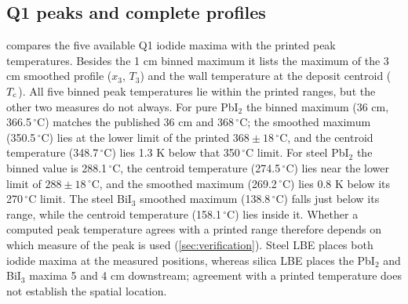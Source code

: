\subsection{Q1 peaks and complete profiles}
 compares the five available Q1 iodide maxima with the
printed peak temperatures. Besides the 1 cm binned maximum it lists the
maximum of the 3 cm smoothed profile ($x_3$, $T_3$) and the wall
temperature at the deposit centroid ($T_{\rm c}$). All five binned peak
temperatures lie within the printed ranges, but the other two measures
do not always. For pure PbI$_2$ the binned maximum (36 cm,
366.5\,$^\circ$C) matches the published 36 cm and 368\,$^\circ$C; the
smoothed maximum (350.5\,$^\circ$C) lies at the lower limit of the
printed $368\pm18$\,$^\circ$C, and the centroid temperature
(348.7\,$^\circ$C) lies 1.3 K below that 350\,$^\circ$C limit. For steel
PbI$_2$ the binned value is 288.1\,$^\circ$C, the centroid temperature
(274.5\,$^\circ$C) lies near the lower limit of $288\pm18$\,$^\circ$C,
and the smoothed maximum (269.2\,$^\circ$C) lies 0.8 K below its
270\,$^\circ$C limit. The steel BiI$_3$ smoothed maximum
(138.8\,$^\circ$C) falls just below its range, while the centroid
temperature (158.1\,$^\circ$C) lies inside it. Whether a computed peak
temperature agrees with a printed range therefore depends on which
measure of the peak is used (\cref{sec:verification}). Steel LBE places
both iodide maxima at the measured positions, whereas silica LBE places
the PbI$_2$ and BiI$_3$ maxima 5 and 4 cm downstream; agreement with a
printed temperature does not establish the spatial location.
\begin{table}[tb]
\centering
\caption{Q1 iodide maxima on the production mesh (41,472 cells,
limited-linear advection), compared with the published peaks. Subscript
bin: 1 cm binned maximum; subscript 3: maximum of the 3 cm smoothed
profile; $T_{\rm c}$: wall temperature at the deposit centroid.
Positions are in cm and temperatures in $^\circ$C. Experimental
temperature ranges are those printed by Liu et al.\
\cite{Liu2025chemical}; they are not statistical confidence intervals
for model error.}
\label{tab:peaks}
\small
\end{table}


